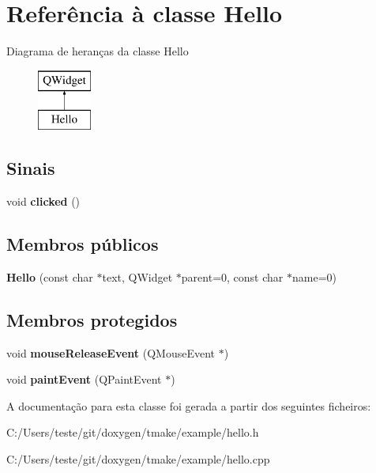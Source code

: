 \hypertarget{class_hello}{\section{Referência à classe Hello}
\label{class_hello}
}
Diagrama de heranças da classe Hello\begin{figure}[H]
\begin{center}
\leavevmode
\includegraphics[height=2.000000cm]{class_hello}
\end{center}
\end{figure}
\subsection*{Sinais}
\begin{DoxyCompactItemize}
\item 
\hypertarget{class_hello_a263c24e31a1115d0b7b016189a710cb8}{void {\bfseries clicked} ()}\label{class_hello_a263c24e31a1115d0b7b016189a710cb8}

\end{DoxyCompactItemize}
\subsection*{Membros públicos}
\begin{DoxyCompactItemize}
\item 
\hypertarget{class_hello_a7b84bece673b4d41f5c679d641c2b66d}{{\bfseries Hello} (const char $\ast$text, Q\-Widget $\ast$parent=0, const char $\ast$name=0)}\label{class_hello_a7b84bece673b4d41f5c679d641c2b66d}

\end{DoxyCompactItemize}
\subsection*{Membros protegidos}
\begin{DoxyCompactItemize}
\item 
\hypertarget{class_hello_a158642bef03883cc4157b8b40e1aa0ea}{void {\bfseries mouse\-Release\-Event} (Q\-Mouse\-Event $\ast$)}\label{class_hello_a158642bef03883cc4157b8b40e1aa0ea}

\item 
\hypertarget{class_hello_ad06d035e601c42cc2a3b9d1229c73d36}{void {\bfseries paint\-Event} (Q\-Paint\-Event $\ast$)}\label{class_hello_ad06d035e601c42cc2a3b9d1229c73d36}

\end{DoxyCompactItemize}


A documentação para esta classe foi gerada a partir dos seguintes ficheiros\-:\begin{DoxyCompactItemize}
\item 
C\-:/\-Users/teste/git/doxygen/tmake/example/hello.\-h\item 
C\-:/\-Users/teste/git/doxygen/tmake/example/hello.\-cpp\end{DoxyCompactItemize}
